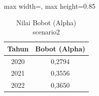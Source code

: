 \begin{table}[H]
\centering
\caption{Nilai Bobot (Alpha) scenario2} \label{tab:sample2alpha}
\begin{adjustbox}{max width=\textwidth, max height=0.85\textheight}
\begin{tabular}{|c|c|}
\hline
\textbf{Tahun} & \textbf{Bobot (Alpha)} \\
\hline
2020 & 0,2794 \\
2021 & 0,3556 \\
2022 & 0,3650 \\
\hline
\end{tabular}
\end{adjustbox}
\end{table}